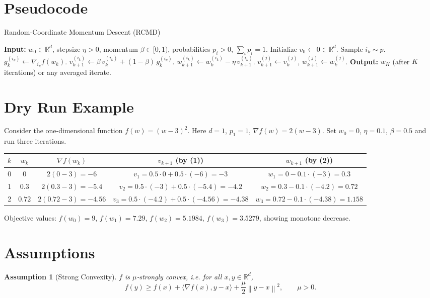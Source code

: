 \documentclass{article}
\newtheorem{assumption}{Assumption}
\newcommand{\R}{\mathbb{R}}
\newcommand{\norm}[1]{\left\|#1\right\|}
\newcommand{\ip}[2]{\langle #1,#2\rangle}
\begin{document}
\section*{Pseudocode}
\begin{algorithm}[H]
\caption{Random‑Coordinate Momentum Descent (RCMD)}
\begin{algorithmic}[1]
\STATE \textbf{Input:} $w_0\in\R^{d}$, stepsize $\eta>0$, momentum $\beta\in[0,1)$, probabilities $p_i>0$, $\sum_i p_i=1$.
\STATE Initialize $v_0\gets 0\in\R^{d}$.
    \STATE Sample $i_k\sim p$.
    \STATE $g^{(i_k)}_k\gets \nabla_{i_k}f(w_k)$.
    \STATE $v^{(i_k)}_{k+1}\gets \beta\,v^{(i_k)}_{k}+(1-\beta)\,g^{(i_k)}_k$.
    \STATE $w^{(i_k)}_{k+1}\gets w^{(i_k)}_{k}-\eta\,v^{(i_k)}_{k+1}$.
        \STATE $v^{(j)}_{k+1}\gets v^{(j)}_{k}$, \quad $w^{(j)}_{k+1}\gets w^{(j)}_{k}$.
    \ENDFOR
\ENDFOR
\STATE \textbf{Output:} $w_K$ (after $K$ iterations) or any averaged iterate.
\end{algorithmic}
\end{algorithm}

\section*{Dry Run Example}
Consider the one‑dimensional function $f(w)=(w-3)^2$.
Here $d=1$, $p_1=1$, $\nabla f(w)=2(w-3)$.
Set $w_0=0$, $\eta=0.1$, $\beta=0.5$ and run three iterations.

\begin{center}
\begin{tabular}{c|c|c|c|c}
$k$ & $w_k$ & $\nabla f(w_k)$ & $v_{k+1}$ (by (1)) & $w_{k+1}$ (by (2))\\ \hline
0 & $0$ & $2(0-3)=-6$ & $v_1=0.5\cdot0+0.5\cdot(-6)=-3$ & $w_1=0-0.1\cdot(-3)=0.3$\\[2mm]
1 & $0.3$ & $2(0.3-3)=-5.4$ & $v_2=0.5\cdot(-3)+0.5\cdot(-5.4)=-4.2$ & $w_2=0.3-0.1\cdot(-4.2)=0.72$\\[2mm]
2 & $0.72$ & $2(0.72-3)=-4.56$ & $v_3=0.5\cdot(-4.2)+0.5\cdot(-4.56)=-4.38$ & $w_3=0.72-0.1\cdot(-4.38)=1.158$\\
\end{tabular}
\end{center}

Objective values: $f(w_0)=9$, $f(w_1)=7.29$, $f(w_2)=5.1984$, $f(w_3)=3.5279$, showing monotone decrease.

\newpage
\section*{Assumptions}
\begin{assumption}[Strong Convexity]\label{ass:strong}
$f$ is $\mu$‑strongly convex, i.e. for all $x,y\in\R^{d}$,
\[
f(y)\ge f(x)+\ip{\nabla f(x)}{y-x}+\frac{\mu}{2}\norm{y-x}^{2},
\qquad\mu>0 .
\]
\end{assumption}
\end{document}
